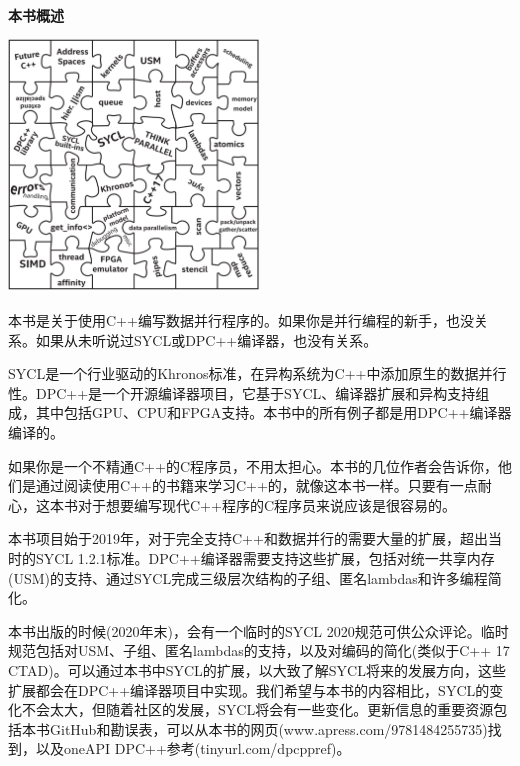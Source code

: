 \documentclass[11pt,a4paper,UTF8]{ctexart}
\begin{document}
	\hspace*{\fill} \\ %
	\noindent\textbf{本书概述}\ \par
	\begin{center}
		\includegraphics[width=0.5\textwidth]{images/Preface}
	\end{center} \par
	本书是关于使用C++编写数据并行程序的。如果你是并行编程的新手，也没关系。如果从未听说过SYCL或DPC++编译器，也没有关系。\par
	
	SYCL是一个行业驱动的Khronos标准，在异构系统为C++中添加原生的数据并行性。DPC++是一个开源编译器项目，它基于SYCL、编译器扩展和异构支持组成，其中包括GPU、CPU和FPGA支持。本书中的所有例子都是用DPC++编译器编译的。\par
	
	如果你是一个不精通C++的C程序员，不用太担心。本书的几位作者会告诉你，他们是通过阅读使用C++的书籍来学习C++的，就像这本书一样。只要有一点耐心，这本书对于想要编写现代C++程序的C程序员来说应该是很容易的。\par
	
	本书项目始于2019年，对于完全支持C++和数据并行的需要大量的扩展，超出当时的SYCL 1.2.1标准。DPC++编译器需要支持这些扩展，包括对统一共享内存(USM)的支持、通过SYCL完成三级层次结构的子组、匿名lambdas和许多编程简化。\par
	
	本书出版的时候(2020年末)，会有一个临时的SYCL 2020规范可供公众评论。临时规范包括对USM、子组、匿名lambdas的支持，以及对编码的简化(类似于C++ 17 CTAD)。可以通过本书中SYCL的扩展，以大致了解SYCL将来的发展方向，这些扩展都会在DPC++编译器项目中实现。我们希望与本书的内容相比，SYCL的变化不会太大，但随着社区的发展，SYCL将会有一些变化。更新信息的重要资源包括本书GitHub和勘误表，可以从本书的网页(www.apress.com/9781484255735)找到，以及oneAPI DPC++参考(tinyurl.com/dpcppref)。\par
	
\end{document}
